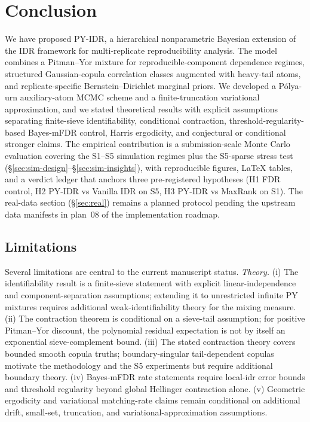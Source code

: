 \section{Conclusion}
\label{sec:conclusion}

We have proposed PY-IDR, a hierarchical nonparametric Bayesian extension of
the IDR framework for multi-replicate reproducibility analysis. The model
combines a Pitman--Yor mixture for reproducible-component dependence
regimes, structured Gaussian-copula correlation classes augmented with
heavy-tail atoms, and replicate-specific Bernstein--Dirichlet marginal
priors. We developed a P\'olya-urn auxiliary-atom MCMC scheme and a
finite-truncation variational approximation, and we stated theoretical
results with explicit assumptions separating finite-sieve identifiability,
conditional contraction, threshold-regularity-based Bayes-mFDR control,
Harris ergodicity, and conjectural or conditional stronger claims. The
empirical contribution is a submission-scale Monte Carlo evaluation
covering the S1--S5 simulation regimes plus the S5-sparse stress test
(\S\ref{sec:sim-design}--\S\ref{sec:sim-insights}), with reproducible
figures, LaTeX tables, and a verdict ledger that anchors three
pre-registered hypotheses (H1 FDR control, H2 PY-IDR vs Vanilla IDR on
S5, H3 PY-IDR vs MaxRank on S1). The real-data section
(\S\ref{sec:real}) remains a planned protocol pending the upstream data
manifests in plan~08 of the implementation roadmap.

\subsection{Limitations}

Several limitations are central to the current manuscript status.
\emph{Theory.} (i) The identifiability result is a finite-sieve statement
with explicit linear-independence and component-separation assumptions;
extending it to unrestricted infinite PY mixtures requires additional
weak-identifiability theory for the mixing measure. (ii) The contraction
theorem is conditional on a sieve-tail assumption; for positive Pitman--Yor
discount, the polynomial residual expectation is not by itself an
exponential sieve-complement bound. (iii) The stated contraction theory
covers bounded smooth copula truths; boundary-singular tail-dependent
copulas motivate the methodology and the S5 experiments but require
additional boundary theory. (iv) Bayes-mFDR rate statements require
local-idr error bounds and threshold regularity beyond global Hellinger
contraction alone. (v) Geometric ergodicity and variational matching-rate
claims remain conditional on additional drift, small-set, truncation, and
variational-approximation assumptions.

